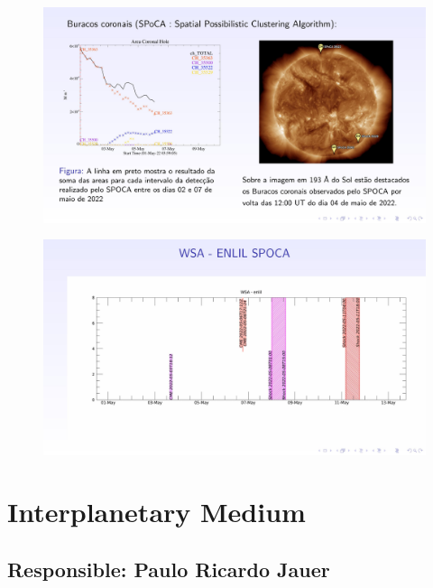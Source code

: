 \documentclass[11pt, oneside]{article}
\begin{document}
    \begin{figure}[H]
        \centering
        \includegraphics[width=14cm]{./figures/en_outfileSun_0.jpg}
    \end{figure} 
 

    
    \begin{figure}[H]
        \centering
        \includegraphics[width=14cm]{./figures/en_outfileSun_1.jpg}
    \end{figure} 
 

    \section{Interplanetary Medium} 
 \subsection{Responsible: Paulo Ricardo Jauer} 
 
\end{document}
